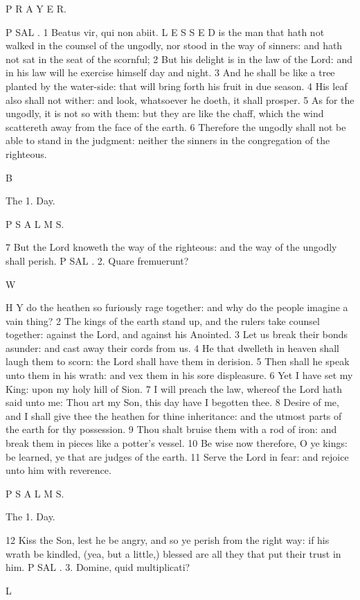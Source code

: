 P R A Y E R.

P SAL . 1 Beatus vir, qui non abiit. L E S S E D is the man that hath not walked in the counsel of the ungodly, nor stood in the way of sinners: and hath not sat in the seat of the scornful; 2 But his delight is in the law of the Lord: and in his law will he exercise himself day and night. 3 And he shall be like a tree planted by the water-side: that will bring forth his fruit in due season. 4 His leaf also shall not wither: and look, whatsoever he doeth, it shall prosper. 5 As for the ungodly, it is not so with them: but they are like the chaff, which the wind scattereth away from the face of the earth. 6 Therefore the ungodly shall not be able to stand in the judgment: neither the sinners in the congregation of the righteous.

B

The 1. Day.

P S A L M S.

7 But the Lord knoweth the way of the righteous: and the way of the ungodly shall perish. P SAL . 2. Quare fremuerunt?

W

H Y do the heathen so furiously rage together: and why do the people imagine a vain thing? 2 The kings of the earth stand up, and the rulers take counsel together: against the Lord, and against his Anointed. 3 Let us break their bonds asunder: and cast away their cords from us. 4 He that dwelleth in heaven shall laugh them to scorn: the Lord shall have them in derision. 5 Then shall he speak unto them in his wrath: and vex them in his sore displeasure. 6 Yet I have set my King: upon my holy hill of Sion. 7 I will preach the law, whereof the Lord hath said unto me: Thou art my Son, this day have I begotten thee. 8 Desire of me, and I shall give thee the heathen for thine inheritance: and the utmost parts of the earth for thy possession. 9 Thou shalt bruise them with a rod of iron: and break them in pieces like a potter’s vessel. 10 Be wise now therefore, O ye kings: be learned, ye that are judges of the earth. 11 Serve the Lord in fear: and rejoice unto him with reverence.

P S A L M S.

The 1. Day.

12 Kiss the Son, lest he be angry, and so ye perish from the right way: if his wrath be kindled, (yea, but a little,) blessed are all they that put their trust in him. P SAL . 3. Domine, quid multiplicati?

L

